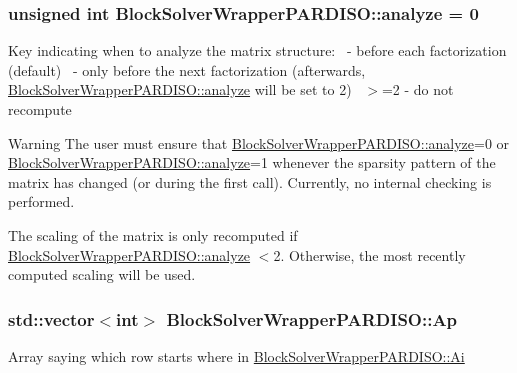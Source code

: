 \subsubsection[{\texorpdfstring{analyze}{analyze}}]{\setlength{\rightskip}{0pt plus 5cm}unsigned int Block\+Solver\+Wrapper\+P\+A\+R\+D\+I\+S\+O\+::analyze = 0}\hypertarget{class_block_solver_wrapper_p_a_r_d_i_s_o_a3df0818f957b743717ce4bfd463ff8dd}{}\label{class_block_solver_wrapper_p_a_r_d_i_s_o_a3df0818f957b743717ce4bfd463ff8dd}
Key indicating when to analyze the matrix structure\+:~ -\/ before each factorization (default)~ -\/ only before the next factorization (afterwards, \hyperlink{class_block_solver_wrapper_p_a_r_d_i_s_o_a3df0818f957b743717ce4bfd463ff8dd}{Block\+Solver\+Wrapper\+P\+A\+R\+D\+I\+S\+O\+::analyze} will be set to 2)~\newline
 $>$=2 -\/ do not recompute

\begin{DoxyWarning}{Warning}
The user must ensure that \hyperlink{class_block_solver_wrapper_p_a_r_d_i_s_o_a3df0818f957b743717ce4bfd463ff8dd}{Block\+Solver\+Wrapper\+P\+A\+R\+D\+I\+S\+O\+::analyze}=0 or \hyperlink{class_block_solver_wrapper_p_a_r_d_i_s_o_a3df0818f957b743717ce4bfd463ff8dd}{Block\+Solver\+Wrapper\+P\+A\+R\+D\+I\+S\+O\+::analyze}=1 whenever the sparsity pattern of the matrix has changed (or during the first call). Currently, no internal checking is performed.

The scaling of the matrix is only recomputed if \hyperlink{class_block_solver_wrapper_p_a_r_d_i_s_o_a3df0818f957b743717ce4bfd463ff8dd}{Block\+Solver\+Wrapper\+P\+A\+R\+D\+I\+S\+O\+::analyze} $<$2. Otherwise, the most recently computed scaling will be used. 
\end{DoxyWarning}
\subsubsection[{\texorpdfstring{Ap}{Ap}}]{\setlength{\rightskip}{0pt plus 5cm}std\+::vector$<$int$>$ Block\+Solver\+Wrapper\+P\+A\+R\+D\+I\+S\+O\+::\+Ap\hspace{0.3cm}{\ttfamily [private]}}\hypertarget{class_block_solver_wrapper_p_a_r_d_i_s_o_ad284b0a41b7e8f6ab2f58308dfad7c13}{}\label{class_block_solver_wrapper_p_a_r_d_i_s_o_ad284b0a41b7e8f6ab2f58308dfad7c13}
Array saying which row starts where in \hyperlink{class_block_solver_wrapper_p_a_r_d_i_s_o_a20249115ffb23d1c0d35c22fa76a1257}{Block\+Solver\+Wrapper\+P\+A\+R\+D\+I\+S\+O\+::\+Ai} 
